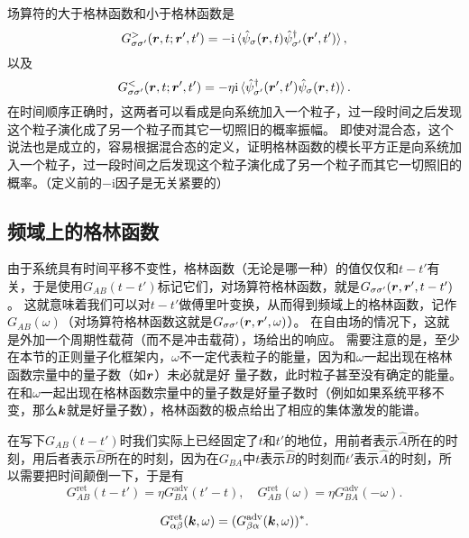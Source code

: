\documentclass[hyperref, UTF8, a4paper]{ctexart}
\newcommand*{\ii}{\mathrm{i}}
\begin{document}
场算符的大于格林函数和小于格林函数是
\begin{equation}
    G^>_{\sigma \sigma'} (\vb*{r}, t; \vb*{r}', t') = - \ii \expval*{\hat{\psi}_\sigma (\vb*{r}, t) \hat{\psi}_{\sigma'}^\dagger (\vb*{r}', t')},
\end{equation}
以及
\begin{equation}
    G^<_{\sigma \sigma'} (\vb*{r}, t; \vb*{r}', t') = - \eta \ii \expval*{\hat{\psi}_{\sigma'}^\dagger (\vb*{r}', t') \hat{\psi}_\sigma (\vb*{r}, t)}.
\end{equation}
在时间顺序正确时，这两者可以看成是向系统加入一个粒子，过一段时间之后发现这个粒子演化成了另一个粒子而其它一切照旧的概率振幅。
即使对混合态，这个说法也是成立的，容易根据混合态的定义，证明格林函数的模长平方正是向系统加入一个粒子，过一段时间之后发现这个粒子演化成了另一个粒子而其它一切照旧的概率。（定义前的$-\ii$因子是无关紧要的）

\subsection{频域上的格林函数}

由于系统具有时间平移不变性，格林函数（无论是哪一种）的值仅仅和$t-t'$有关，于是使用$G_{AB}(t-t')$标记它们，对场算符格林函数，就是$G_{\sigma \sigma'}(\vb*{r}, \vb*{r}', t-t')$。
这就意味着我们可以对$t-t'$做傅里叶变换，从而得到频域上的格林函数，记作$G_{AB}(\omega)$（对场算符格林函数这就是$G_{\sigma \sigma'}(\vb*{r}, \vb*{r}', \omega)$）。
在自由场的情况下，这就是外加一个周期性载荷（而不是冲击载荷），场给出的响应。
需要注意的是，至少在本节的正则量子化框架内，$\omega$不一定代表粒子的能量，因为和$\omega$一起出现在格林函数宗量中的量子数（如$\vb*{r}$）未必就是好
量子数，此时粒子甚至没有确定的能量。
在和$\omega$一起出现在格林函数宗量中的量子数是好量子数时（例如如果系统平移不变，那么$\vb*{k}$就是好量子数），格林函数的极点给出了相应的集体激发的能谱。

在写下$G_{AB}(t-t')$时我们实际上已经固定了$t$和$t'$的地位，用前者表示$\hat{A}$所在的时刻，用后者表示$\hat{B}$所在的时刻，因为在$G_{BA}$中$t$表示$\hat{B}$的时刻而$t'$表示$\hat{A}$的时刻，所以需要把时间颠倒一下，于是有
\begin{equation}
    G^\text{ret}_{AB}(t-t') = \eta G^\text{adv}_{BA}(t'-t), \quad G^\text{ret}_{AB}(\omega) = \eta G^\text{adv}_{BA}(-\omega).
\end{equation}

\begin{equation}
    G^\text{ret}_{\alpha \beta} (\vb*{k}, \omega) = (G^\text{adv}_{\beta \alpha}(\vb*{k}, \omega))^*.
\end{equation}
\end{document}
